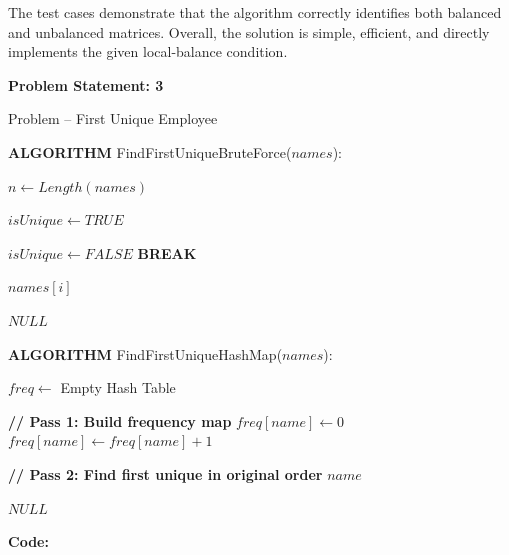 \documentclass[12pt]{article}
\begin{document}
The test cases demonstrate that the algorithm correctly identifies both balanced and unbalanced matrices. Overall, the solution is simple, efficient, and directly implements the given local-balance condition.

\newpage

\textbf{Problem Statement: 3}

Problem – First Unique Employee

\begin{algorithm}[H]
\caption{FindFirstUniqueBruteForce}
\begin{algorithmic}[1]

\State \textbf{ALGORITHM} FindFirstUniqueBruteForce($names$):

\State $n \gets Length(names)$

    \State $isUnique \gets TRUE$

            \State $isUnique \gets FALSE$
            \State \textbf{BREAK}
        \EndIf
    \EndFor

        \State \Return $names[i]$
    \EndIf
\EndFor

\State \Return $NULL$

\end{algorithmic}
\end{algorithm}

\begin{algorithm}[H]
\caption{FindFirstUniqueHashMap}
\begin{algorithmic}[1]

\State \textbf{ALGORITHM} FindFirstUniqueHashMap($names$):

\State $freq \gets$ Empty Hash Table

\State \textbf{// Pass 1: Build frequency map}
        \State $freq[name] \gets 0$
    \EndIf
    \State $freq[name] \gets freq[name] + 1$
\EndFor

\State \textbf{// Pass 2: Find first unique in original order}
        \State \Return $name$
    \EndIf
\EndFor

\State \Return $NULL$

\end{algorithmic}
\end{algorithm}

\textbf{Code:}
\end{document}
